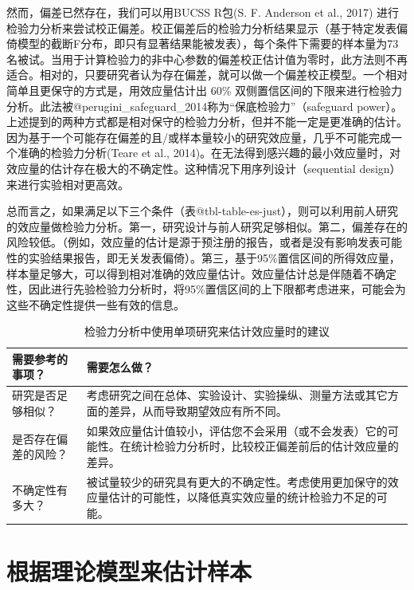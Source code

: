 \documentclass[
  letterpaper,
  DIV=11,
  numbers=noendperiod]{scrreprt}
\begin{document}
然而，偏差已然存在，我们可以用BUCSS R包(S. F. Anderson et al., 2017)
进行检验力分析来尝试校正偏差。校正偏差后的检验力分析结果显示（基于特定发表偏倚模型的截断F分布，即只有显著结果能被发表），每个条件下需要的样本量为73名被试。当用于计算检验力的非中心参数的偏差校正估计值为零时，此方法则不再适合。相对的，只要研究者认为存在偏差，就可以做一个偏差校正模型。一个相对简单且更保守的方式是，用效应量估计出
60\%
双侧置信区间的下限来进行检验力分析。此法被@perugini\_safeguard\_2014称为``保底检验力''（safeguard
power）。上述提到的两种方式都是相对保守的检验力分析，但并不能一定是更准确的估计。因为基于一个可能存在偏差的且/或样本量较小的研究效应量，几乎不可能完成一个准确的检验力分析(Teare
et al.,
2014)。在无法得到感兴趣的最小效应量时，对效应量的估计存在极大的不确定性。这种情况下用序列设计（sequential
design）来进行实验相对更高效。

总而言之，如果满足以下三个条件（表@tbl-table-es-just），则可以利用前人研究的效应量做检验力分析。第一，研究设计与前人研究足够相似。第二，偏差存在的风险较低。（例如，效应量的估计是源于预注册的报告，或者是没有影响发表可能性的实验结果报告，即无关发表偏倚）。第三，基于95\%置信区间的所得效应量，样本量足够大，可以得到相对准确的效应量估计。效应量估计总是伴随着不确定性，因此进行先验检验力分析时，将95\%置信区间的上下限都考虑进来，可能会为这些不确定性提供一些有效的信息。

\hypertarget{tbl-table-es-just}{}
\begin{table}
\caption{\label{tbl-table-es-just}检验力分析中使用单项研究来估计效应量时的建议 }\tabularnewline

\centering
\begin{tabular}{>{\raggedright\arraybackslash}p{5cm}|>{\raggedright\arraybackslash}p{10cm}}
\hline
需要参考的事项？ & 需要怎么做？\\
\hline
研究是否足够相似？ & 考虑研究之间在总体、实验设计、实验操纵、测量方法或其它方面的差异，从而导致期望效应有所不同。\\
\hline
是否存在偏差的风险？ & 如果效应量估计值较小，评估您不会采用（或不会发表）它的可能性。在统计检验力分析时，比较校正偏差前后的估计效应量的差异。\\
\hline
不确定性有多大？ & 被试量较少的研究具有更大的不确定性。考虑使用更加保守的效应量估计的可能性，以降低真实效应量的统计检验力不足的可能。\\
\hline
\end{tabular}
\end{table}

\hypertarget{ux6839ux636eux7406ux8bbaux6a21ux578bux6765ux4f30ux8ba1ux6837ux672c}{%
\section{根据理论模型来估计样本}\label{ux6839ux636eux7406ux8bbaux6a21ux578bux6765ux4f30ux8ba1ux6837ux672c}}
\end{document}
